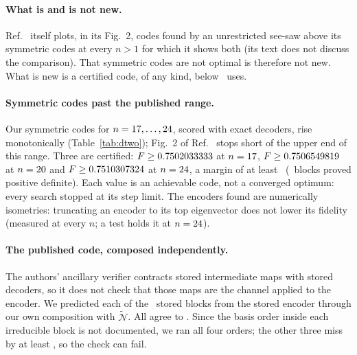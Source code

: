 \documentclass[aps,pra,twocolumn,superscriptaddress,nofootinbib,longbibliography,floatfix]{revtex4-2}
\newcommand{\nt}{\widetilde{\mathcal N}}
\begin{document}
\begin{table}[tbp]
\caption{Codes for Smith and Yard's pair ($d=2$). \emph{Code}: $a{+}b$ for a two-group code, sym.\ for a symmetric one. \emph{Authors'}: the floating-point values of symmetric (isometric-ansatz) codes in the public table of Ref.~\cite{parentin2026onset}'s authors (\url{https://github.com/bbbergh/permqit}, commit \PermqitCommit); the published paper prints \PubFPrinted\ for its code at $n=\PubN$ (\PubF\ in its ancillary data), and the table's value at $n=\PubN$ belongs to a later code of the same ansatz, better by \AuthLaterGain. \emph{$F$ (float)}: our code's fidelity with its stored decoders (two-group) or with exact decoders (symmetric). \emph{Certified}: the lower bound, truncated. The $n=\TgFourteenN$ row is the best code our search found there; it bounds nothing about other codes.}
\label{tab:dtwo}
\small\setlength{\tabcolsep}{4pt}

\end{table}

\paragraph*{What is and is not new.} Ref.~\cite{parentin2026onset} itself plots, in its Fig.~2, codes found by an unrestricted see-saw above its symmetric codes at every $n>1$ for which it shows both (its text does not discuss the comparison). That symmetric codes are not optimal is therefore not new. What is new is a certified code, of any kind, below \PubN\ uses.

\paragraph*{Symmetric codes past the published range.} Our symmetric codes for $n=17,\dots,24$, scored with exact decoders, rise monotonically (Table~\ref{tab:dtwo}); Fig.~2 of Ref.~\cite{parentin2026onset} stops short of the upper end of this range. Three are certified: $F\ge0.7502033333$ at $n=17$, $F\ge0.7506549819$ at $n=20$ and $F\ge0.7510307324$ at $n=24$, a margin of at least \SymCertMargin\ (\SymCertBlocks\ blocks proved positive definite). Each value is an achievable code, not a converged optimum: every search stopped at its step limit. The encoders found are numerically isometries: truncating an encoder to its top eigenvector does not lower its fidelity (measured at every $n$; a test holds it at $n=24$).

\paragraph*{The published code, composed independently.} The authors' ancillary verifier contracts stored intermediate maps with stored decoders, so it does not check that those maps are the channel applied to the encoder. We predicted each of the \StoredBlocks\ stored blocks from the stored encoder through our own composition with $\nt$. All agree to \StoredResid. Since the basis order inside each irreducible block is not documented, we ran all four orders; the other three miss by at least \StoredOther, so the check can fail.
\end{document}
